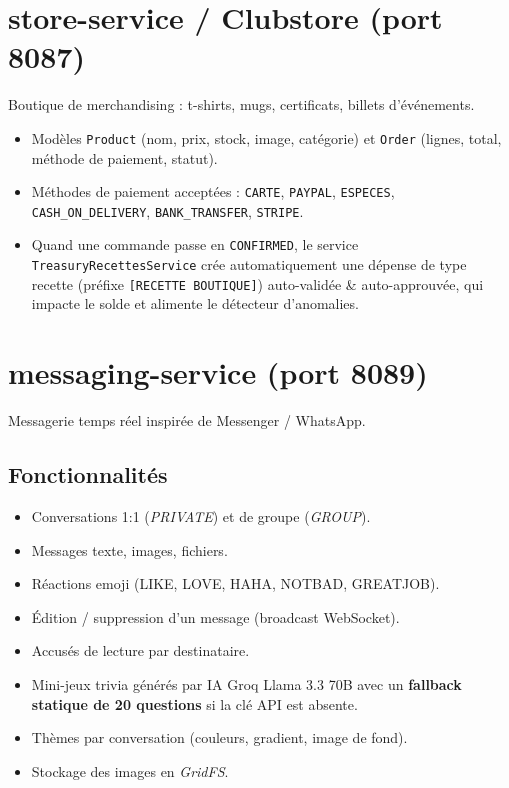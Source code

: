 \documentclass[11pt,a4paper]{report}
\begin{document}
\section{store-service / Clubstore (port 8087)}

Boutique de merchandising : t-shirts, mugs, certificats, billets d'événements.

\begin{itemize}
  \item Modèles \texttt{Product} (nom, prix, stock, image, catégorie) et
        \texttt{Order} (lignes, total, méthode de paiement, statut).
  \item Méthodes de paiement acceptées : \texttt{CARTE}, \texttt{PAYPAL},
        \texttt{ESPECES}, \texttt{CASH\_ON\_DELIVERY}, \texttt{BANK\_TRANSFER},
        \texttt{STRIPE}.
  \item Quand une commande passe en \texttt{CONFIRMED}, le service
        \texttt{TreasuryRecettesService} crée automatiquement une dépense de
        type \og recette \fg (préfixe \texttt{[RECETTE BOUTIQUE]}) auto-validée
        \& auto-approuvée, qui impacte le solde et alimente le détecteur
        d'anomalies.
\end{itemize}

\section{messaging-service (port 8089)}

Messagerie temps réel inspirée de Messenger / WhatsApp.

\subsection{Fonctionnalités}
\begin{itemize}
  \item Conversations 1:1 (\textit{PRIVATE}) et de groupe (\textit{GROUP}).
  \item Messages texte, images, fichiers.
  \item Réactions emoji (LIKE, LOVE, HAHA, NOTBAD, GREATJOB).
  \item Édition / suppression d'un message (broadcast WebSocket).
  \item Accusés de lecture par destinataire.
  \item Mini-jeux trivia générés par IA Groq Llama 3.3 70B avec un
        \textbf{fallback statique de 20 questions} si la clé API est absente.
  \item Thèmes par conversation (couleurs, gradient, image de fond).
  \item Stockage des images en \textit{GridFS}.
\end{itemize}
\end{document}
